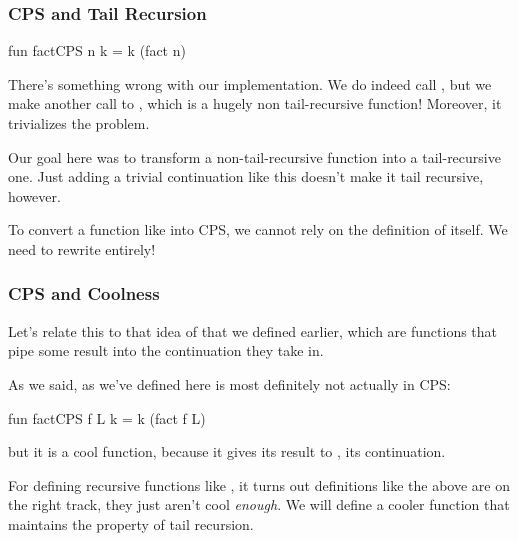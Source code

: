 \documentclass[aspectratio=169]{beamer}
\begin{document}
\begin{frame}[fragile]
  \frametitle{CPS and Tail Recursion}

  \begin{codeblock}
    fun factCPS n k = k (fact n)
  \end{codeblock}

  \pause
  \vspace{\fill}


  \pause
  \vspace{\fill}

  There's something wrong with our implementation. We do indeed call
  , but we make another call to , which is a hugely
  non tail-recursive function! Moreover, it trivializes the problem.

  \pause
  \vspace{\fill}

  Our goal here was to transform a non-tail-recursive function into
  a tail-recursive one. Just adding a trivial continuation
  like this doesn't make it tail recursive, however.

  \pause
  \vspace{\fill}

  To convert a function like  into CPS, we cannot rely on the
  definition of  itself. We need to rewrite  entirely!
\end{frame}

\begin{frame}[fragile]
  \frametitle{CPS and Coolness}

  Let's relate this to that idea of  that we defined earlier,
  which are functions that pipe some result into the continuation they take in.

  \pause
  \vspace{\fill}

  As we said,  as we've defined here is most definitely not
  actually in CPS:
  \begin{codeblock}
    fun factCPS f L k = k (fact f L)
  \end{codeblock}
  but it is a cool function, because it gives its result to , its
  continuation.

  \pause
  \vspace{\fill}


  \pause
  \vspace{\fill}

  For defining recursive functions like , it turns out definitions
  like the above are on the right track, they just aren't cool \textit{enough}.
  We will define a cooler function that maintains the property of tail recursion.
\end{frame}
\end{document}
